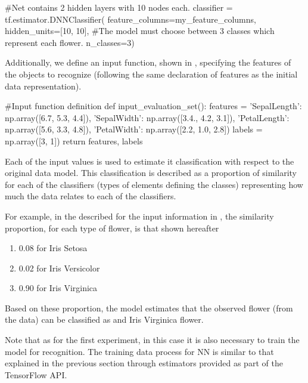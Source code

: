 \begin{tensorflow}[
	label={lst:nn-definition},
	caption={Neural network definition}]
 #Net contains 2 hidden layers with 10 nodes each.
 classifier = tf.estimator.DNNClassifier(
    feature_columns=my_feature_columns,
    hidden_units=[10, 10],
 #The model must choose between 3 classes which represent each flower.
    n_classes=3)
\end{tensorflow}

Additionally, we define an input function, shown in , specifying the features of 
the objects to recognize (following the same declaration of features as the initial data representation).

\begin{tensorflow}[
	label={lst:input-definition},
	caption={Input definition}]
 #Input function definition
 def input_evaluation_set():
    features = {'SepalLength': np.array([6.7, 5.3, 4.4]),
                'SepalWidth':  np.array([3.4., 4.2, 3.1]),
                'PetalLength': np.array([5.6, 3.3, 4.8]),
                'PetalWidth':  np.array([2.2, 1.0, 2.8])}
    labels = np.array([3, 1])
    return features, labels
\end{tensorflow}

Each of the input values is used to estimate it classification with respect to the original data model. 
This classification is described as a proportion of similarity for each of the classifiers (\ie types of 
elements defining the classes) representing how much the data relates to each of the classifiers.

For example, in the described for the input information in , the similarity 
proportion, for each type of flower, is that shown hereafter
\begin{enumerate}
 \item 0.08 for Iris Setosa
 \item 0.02 for Iris Versicolor
 \item 0.90 for Iris Virginica
\end{enumerate}

Based on these proportion, the model estimates that the observed flower (from the data) can be 
classified as and Iris Virginica flower. 

Note that as for the first experiment, in this case it is also necessary to train the model for recognition. 
The training data process for \ac{NN} is similar to that explained in the previous section through  
estimators provided as part of the TensorFlow API. 


